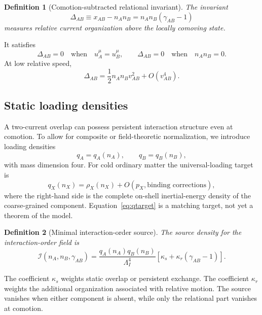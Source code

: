 \documentclass[11pt]{article}
\newtheorem{definition}{Definition}[section]
\begin{document}
\begin{definition}[Comotion-subtracted relational invariant]
The invariant
\begin{equation}
\Delta_{AB}
\equiv x_{AB}-n_An_B
=n_An_B(\gamma_{AB}-1)
\label{eq:DeltaAB}
\end{equation}
measures relative current organization above the locally comoving state.
\end{definition}
It satisfies
\begin{equation}
\Delta_{AB}=0
\quad\text{when}\quad u_A^\mu=u_B^\mu,
\qquad
\Delta_{AB}=0
\quad\text{when}\quad n_A n_B=0.
\label{eq:Deltalimits}
\end{equation}
At low relative speed,
\begin{equation}
\Delta_{AB}
=\frac12n_An_Bv_{AB}^2+O(v_{AB}^4).
\label{eq:Deltalowv}
\end{equation}

\subsection{Static loading densities}

A two-current overlap can possess persistent interaction structure even at comotion.  To allow for composite or field-theoretic normalization, we introduce loading densities
\begin{equation}
q_A=q_A(n_A),
\qquad
q_B=q_B(n_B),
\label{eq:qdefs}
\end{equation}
with mass dimension four.  For cold ordinary matter the universal-loading target is
\begin{equation}
q_X(n_X)=\rho_X(n_X)+O(p_X,\text{binding corrections}),
\label{eq:qtarget}
\end{equation}
where the right-hand side is the complete on-shell inertial-energy density of the coarse-grained component.  Equation~\eqref{eq:qtarget} is a matching target, not yet a theorem of the model.

\begin{definition}[Minimal interaction-order source]
The source density for the interaction-order field is
\begin{equation}
\boxed{
\mathcal I(n_A,n_B,\gamma_{AB})
=
\frac{q_A(n_A)q_B(n_B)}{\Lambda_I^4}
\left[\kappa_s+\kappa_r(\gamma_{AB}-1)\right].
}
\label{eq:Isource}
\end{equation}
\end{definition}
The coefficient $\kappa_s$ weights static overlap or persistent exchange.  The coefficient $\kappa_r$ weights the additional organization associated with relative motion.  The source vanishes when either component is absent, while only the relational part vanishes at comotion.
\end{document}
